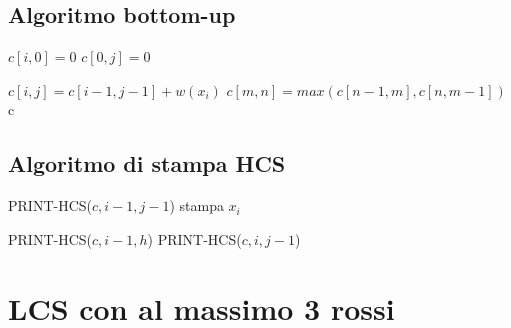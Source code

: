 \subsection{Algoritmo bottom-up}
\begin{algorithm}[H]
    \caption{Algoritmo Bottom-up Heaviest Common Subsequence}
    \begin{algorithmic}[1]
             
                \State $c[i,0] = 0$
            \EndFor
             
                \State $c[0,j] = 0$
            \EndFor
        
                     
                        \State $c[i,j]=c[i-1,j-1]+w(x_i)$
                    \Else {}
                        \State $c[m,n] = max(c[n-1,m],c[n,m-1])$
                    \EndIf
                \EndFor
            \EndFor
            \State \Return c
        \EndProcedure

    \end{algorithmic}
\end{algorithm}

\subsection{Algoritmo di stampa HCS}
\begin{algorithm}
    \caption{Algoritmo di stampa della HCS}
    \begin{algorithmic}
                \State \Return
            \EndIf
                \State PRINT-HCS($c,i-1,j-1$)
                \State stampa $x_i$

                \Else
                        \State PRINT-HCS($c,i-1,h$)
                    \Else
                        \State PRINT-HCS($c,i,j-1$)
                    \EndIf
            \EndIf
        \EndProcedure
    \end{algorithmic}
\end{algorithm}

\newpage
\section{LCS con al massimo 3 rossi}

